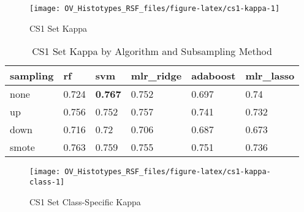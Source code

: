 \documentclass[
]{report}
\begin{document}
\begin{figure}[H]

{\centering \texttt{[image: OV\_Histotypes\_RSF\_files/figure-latex/cs1-kappa-1]} 

}

\caption{CS1 Set Kappa}\label{fig:cs1-kappa}
\end{figure}

\begin{table}

\caption{\label{tab:cs1-kappa-table}CS1 Set Kappa by Algorithm and Subsampling Method}
\centering
\begin{tabular}[t]{l|l|l|l|l|l}
\hline
sampling & rf & svm & mlr\_ridge & adaboost & mlr\_lasso\\
\hline
none & 0.724 & \textbf{0.767} & 0.752 & 0.697 & 0.74\\
\hline
up & 0.756 & 0.752 & 0.757 & 0.741 & 0.732\\
\hline
down & 0.716 & 0.72 & 0.706 & 0.687 & 0.673\\
\hline
smote & 0.763 & 0.759 & 0.755 & 0.751 & 0.736\\
\hline
\end{tabular}
\end{table}

\begin{figure}[H]

{\centering \texttt{[image: OV\_Histotypes\_RSF\_files/figure-latex/cs1-kappa-class-1]} 

}

\caption{CS1 Set Class-Specific Kappa}\label{fig:cs1-kappa-class}
\end{figure}
\end{document}
